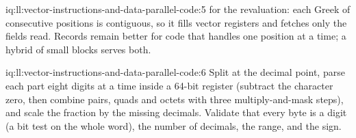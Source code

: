 \begin{solution}{iq:ll:vector-instructions-and-data-parallel-code:5}
 for the revaluation: each Greek of consecutive positions is contiguous, so it fills vector registers and
fetches only the fields read. Records remain better for code that handles one position at a time; a hybrid of small blocks
serves both.
\end{solution}

\begin{solution}{iq:ll:vector-instructions-and-data-parallel-code:6}
Split at the decimal point, parse each part eight digits at a time inside a 64-bit register (subtract the character zero,
then combine pairs, quads and octets with three multiply-and-mask steps), and scale the fraction by the missing decimals.
Validate that every byte is a digit (a bit test on the whole word), the number of decimals, the range, and the sign.
\end{solution}
